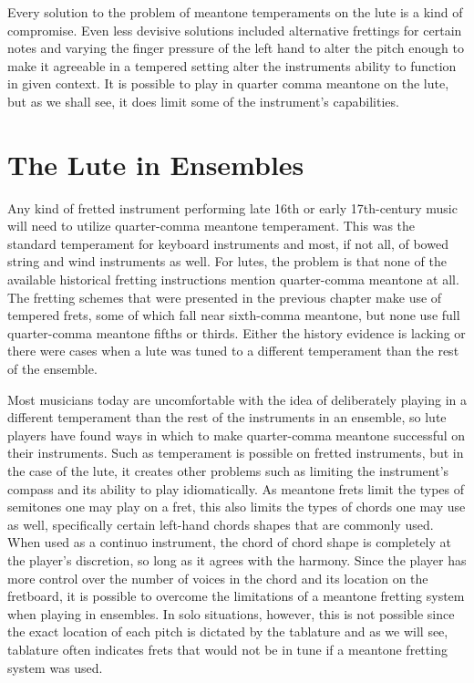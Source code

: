 Every solution to the problem of meantone temperaments on the lute is a kind of
compromise.  Even less devisive solutions included alternative frettings for certain notes
and varying the finger pressure of the left hand to alter the pitch enough to make it
agreeable in a tempered setting alter the instruments ability to function in given
context.  It is possible to play in quarter comma meantone on the lute, but as we shall
see, it does limit some of the instrument's capabilities.

\section{The Lute in Ensembles}

Any kind of fretted instrument performing late 16th or early 17th-century music will need
to utilize quarter-comma meantone temperament.  This was the standard temperament for
keyboard instruments and most, if not all, of bowed string and wind instruments as well.
For lutes, the problem is that none of the available historical fretting instructions
mention quarter-comma meantone at all.  The fretting schemes that were presented in the
previous chapter make use of tempered frets, some of which fall near sixth-comma meantone,
but none use full quarter-comma meantone fifths or thirds.  Either the history evidence is
lacking or there were cases when a lute was tuned to a different temperament than the rest
of the ensemble.

Most musicians today are uncomfortable with the idea of deliberately playing in a
different temperament than the rest of the instruments in an ensemble, so lute players
have found ways in which to make quarter-comma meantone successful on their instruments.
Such as temperament is possible on fretted instruments, but in the case of the lute, it
creates other problems such as limiting the instrument's compass and its ability to play
idiomatically.  As meantone frets limit the types of semitones one may play on a fret,
this also limits the types of chords one may use as well, specifically certain left-hand
chords shapes that are commonly used.  When used as a continuo instrument, the chord of
chord shape is completely at the player's discretion, so long as it agrees with the
harmony.  Since the player has more control over the number of voices in the chord and its
location on the fretboard, it is possible to overcome the limitations of a meantone
fretting system when playing in ensembles.  In solo situations, however, this is not
possible since the exact location of each pitch is dictated by the tablature and as we
will see, tablature often indicates frets that would not be in tune if a meantone fretting
system was used.

